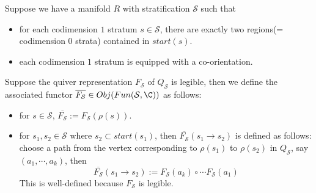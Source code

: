 \begin{definition}
Suppose we have a manifold $R$ with stratification $\mathcal{S}$ such that
\begin{itemize}
\item for each codimension $1$ stratum $s\in \mathcal{S}$, there are exactly two regions(= codimension $0$ strata) contained in $start(s)$.

\item each codimension $1$ stratum is equipped with a co-orientation.
\end{itemize}
Suppose the quiver representation $F_\mathcal{S}$ of $Q_\mathcal{S}$ is legible, then we define the associated functor $\overline{F_\mathcal{S}}\in Obj(Fun(\mathcal{S}, \C))$ as follows:
\begin{itemize}
\item for $s\in \mathcal{S}$, $\overline{F_\mathcal{S}} := F_\mathcal{S}(\rho(s))$.

\item for $s_1,s_2 \in \mathcal{S}$ where $s_2 \subset start(s_1)$, then $\overline{F_\mathcal{S}}(s_1 \rightarrow s_2)$ is defined as follows: choose a path from the vertex corresponding to $\rho(s_1)$ to $\rho(s_2)$ in $Q_\mathcal{S}$, say $(a_1,\cdots,a_k)$, then 
\[
\overline{F_\mathcal{S}}(s_1 \rightarrow s_2) := F_\mathcal{S}(a_k)\circ\cdots F_\mathcal{S}(a_1)
\] 
This is well-defined because $F_\mathcal{S}$ is legible.
\end{itemize}
\end{definition}

